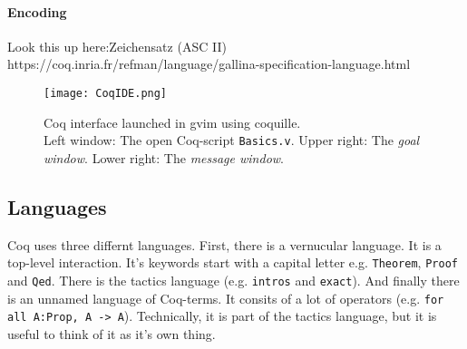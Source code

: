 \paragraph{Encoding}
Look this up here:Zeichensatz (ASC II)\\
https://coq.inria.fr/refman/language/gallina-specification-language.html

\begin{figure}[h]
\texttt{[image: CoqIDE.png]}
\caption{Coq interface launched in gvim using coquille.\\ 
Left window: The open Coq-script \texttt{Basics.v}.
Upper right: The {\itshape goal window}. 
Lower right: The {\itshape message window}.}
\label{fig:Coquille}
\end{figure}

\subsection{Languages}
Coq uses three differnt languages. 
First, there is a vernucular language. 
It is a top-level interaction. 
It's keywords start with a capital letter e.g. \lstinline!Theorem!, \lstinline!Proof! and  \lstinline!Qed!. 
There is the tactics language (e.g. \lstinline!intros! and \lstinline!exact!).
And finally there is an unnamed language of Coq-terms. 
It consits of a lot of operators (e.g. \lstinline!for all A:Prop, A -> A!).
Technically, it is part of the tactics language, but it is useful to think of it as it's own thing.